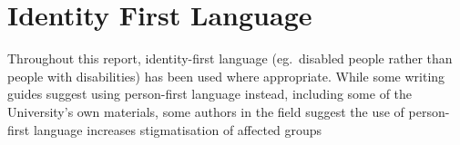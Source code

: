 

\section{Identity First Language}
Throughout this report, identity-first language (eg.\ disabled people rather than people with disabilities) has been used where appropriate. 
While some writing guides suggest using person-first language instead, including some of the University's own materials, %
some authors in the field suggest the use of person-first language increases stigmatisation of affected groups\cite{Best2022LanguageMT}\cite{Gernsbacher2017identityfirst}